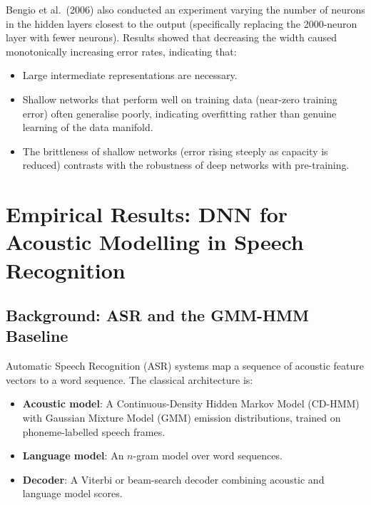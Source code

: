 \documentclass[12pt,a4paper]{article}
\begin{document}
Bengio et al.\ (2006) also conducted an experiment varying the number of
neurons in the hidden layers closest to the output (specifically replacing the
2000-neuron layer with fewer neurons).  Results showed that decreasing the
width caused monotonically increasing error rates, indicating that:

\begin{itemize}[leftmargin=*]
  \item Large intermediate representations are necessary.
  \item Shallow networks that perform well on training data (near-zero training
        error) often generalise poorly, indicating overfitting rather than
        genuine learning of the data manifold.
  \item The brittleness of shallow networks (error rising steeply as capacity
        is reduced) contrasts with the robustness of deep networks with
        pre-training.
\end{itemize}

\newpage

\section{Empirical Results: DNN for Acoustic Modelling in Speech Recognition}
\label{sec:asr}

\subsection{Background: ASR and the GMM-HMM Baseline}

Automatic Speech Recognition (ASR) systems map a sequence of acoustic feature
vectors to a word sequence.  The classical architecture is:

\begin{itemize}[leftmargin=*]
  \item \textbf{Acoustic model}: A Continuous-Density Hidden Markov Model
        (CD-HMM) with Gaussian Mixture Model (GMM) emission distributions,
        trained on phoneme-labelled speech frames.
  \item \textbf{Language model}: An $n$-gram model over word sequences.
  \item \textbf{Decoder}: A Viterbi or beam-search decoder combining
        acoustic and language model scores.
\end{itemize}
\end{document}
